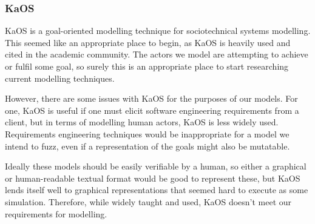 \documentclass{sig-alternate}
\begin{document}
\subsubsection{KaOS} 
KaOS is a goal-oriented modelling technique for sociotechnical systems modelling\cite{Werneck2009}. This seemed like an appropriate place to begin, as KaOS is heavily used and cited in the academic community. The actors we model are attempting to achieve or fulfil some goal, so surely this is an appropriate place to start researching current modelling techniques.\par%
However, there are some issues with KaOS for the purposes of our models. For one, KaOS is useful if one must elicit software engineering requirements from a client, but in terms of modelling human actors, KaOS is less widely used. Requirements engineering techniques would be inappropriate for a model we intend to fuzz, even if a representation of the goals might also be mutatable. \par 
Ideally these models should be easily verifiable by a human, so either a graphical or human-readable textual format would be good to represent these, but KaOS lends itself well to graphical representations that seemed hard to execute as some simulation. Therefore, while widely taught and used, KaOS doesn't meet our requirements for modelling. \par
\end{document}
